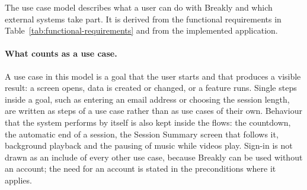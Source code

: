 
\newenvironment{ucspec}[2]{%
  \begingroup
  \small
  \renewcommand{\arraystretch}{1.3}%
  \begin{longtable}{|>{\raggedright\arraybackslash}p{0.21\textwidth}|>{\raggedright\arraybackslash}p{0.71\textwidth}|}
  \caption{#1}\label{#2}\\ \hline
  \textbf{Field} & \textbf{Description} \\ \hline
  \endfirsthead
  \multicolumn{2}{c}{{\bfseries \tablename\ \thetable{} -- continued from previous page}} \\ \hline
  \textbf{Field} & \textbf{Description} \\ \hline
  \endhead
}{%
  \end{longtable}
  \endgroup
}
\newcommand{\ucrow}[2]{\textbf{#1} & #2 \\ \hline}

The use case model describes what a user can do with Breakly and which
external systems take part. It is derived from the functional requirements in
Table~\ref{tab:functional-requirements} and from the implemented application.

\paragraph{What counts as a use case.}
A use case in this model is a goal that the user starts and that produces a
visible result: a screen opens, data is created or changed, or a feature runs.
Single steps inside a goal, such as entering an email address or choosing the
session length, are written as steps of a use case rather than as use cases of
their own. Behaviour that the system performs by itself is also kept inside the
flows: the countdown, the automatic end of a session, the Session Summary
screen that follows it, background playback and the pausing of music while
videos play. Sign-in is not drawn as an \guillemotleft include\guillemotright{}
of every other use case, because Breakly can be used without an account; the
need for an account is stated in the preconditions where it applies.

